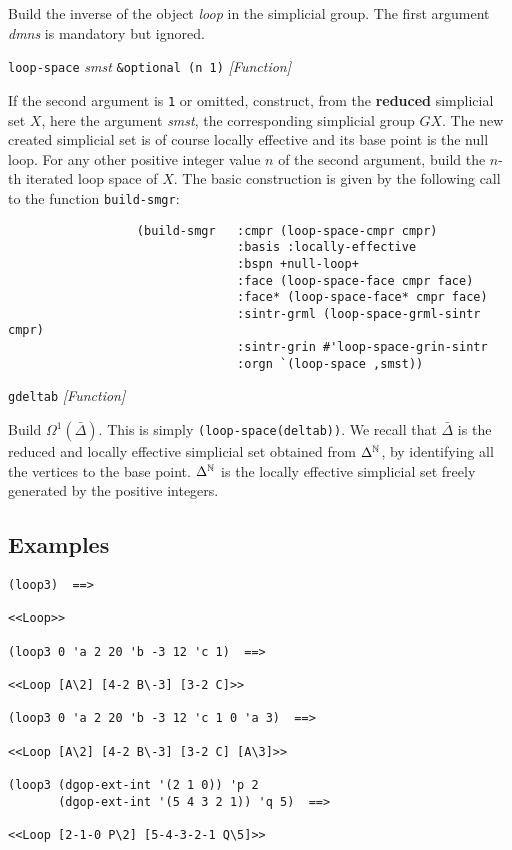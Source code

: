 {{\leftskip=15mm 
Build the inverse of the object {\em loop} in the simplicial group. The first argument {\em dmns}
is mandatory but ignored. \par}
{\leftskip=5mm 
{\tt loop-space} {\em smst} {\tt \&optional (n 1)} \hfill {\em [Function]}  \par}
{\leftskip=15mm 
If the second argument is {\tt 1} or omitted, construct, from the {\bf reduced} simplicial set $X$, 
here the argument {\em smst}, the  corresponding simplicial
group $GX$. The new created simplicial set is of course locally effective and its base point is the null loop. 
For any other positive integer value $n$ of the second argument, build the $n$-th i\-te\-ra\-ted loop space of $X$. 
The basic construction is given by the following call to the function {\tt build-smgr}:
{\footnotesize\begin{verbatim}
                  (build-smgr   :cmpr (loop-space-cmpr cmpr)
                                :basis :locally-effective
                                :bspn +null-loop+
                                :face (loop-space-face cmpr face)
                                :face* (loop-space-face* cmpr face)
                                :sintr-grml (loop-space-grml-sintr cmpr)
                                :sintr-grin #'loop-space-grin-sintr
                                :orgn `(loop-space ,smst))
\end{verbatim}}
 \par}
{\leftskip=5mm 
{\tt gdeltab} \hfill {\em [Function]} \par}
{\leftskip=15mm 
Build $\Omega^1(\bar{\Delta})$. This is simply {\tt (loop-space(deltab))}.
We recall that $\bar{\Delta}$ is the reduced and locally effective simplicial set
obtained from ${\Delta}^{{\Bbb N}}$,  by identifying all the vertices to the base point.
$\Delta^{{\Bbb N}}$ is the locally effective simplicial set freely generated
by the positive integers. \par}
}

\subsection*{Examples}

{\footnotesize\begin{verbatim}
(loop3)  ==>

<<Loop>>

(loop3 0 'a 2 20 'b -3 12 'c 1)  ==>

<<Loop [A\2] [4-2 B\-3] [3-2 C]>>

(loop3 0 'a 2 20 'b -3 12 'c 1 0 'a 3)  ==>

<<Loop [A\2] [4-2 B\-3] [3-2 C] [A\3]>>

(loop3 (dgop-ext-int '(2 1 0)) 'p 2 
       (dgop-ext-int '(5 4 3 2 1)) 'q 5)  ==>

<<Loop [2-1-0 P\2] [5-4-3-2-1 Q\5]>>
\end{verbatim}}

